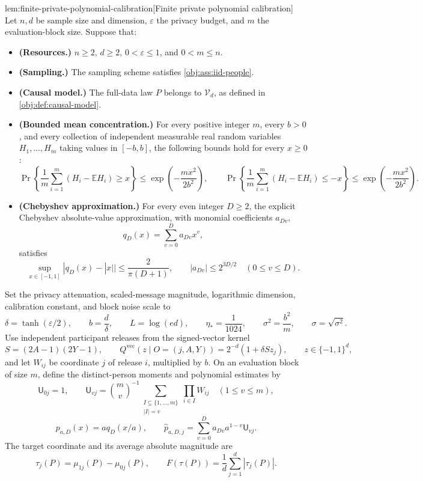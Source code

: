 \begin{lemmav}{lem:finite-private-polynomial-calibration}[Finite private polynomial calibration]
Let \(n,d\) be sample size and dimension, \(\varepsilon\) the privacy budget, and \(m\) the evaluation-block size. Suppose that:
\begin{itemize}
\item \textbf{(Resources.)} \(n\ge2\), \(d\ge2\), \(0<\varepsilon\le1\), and \(0<m\le n\).
\item \textbf{(Sampling.)} The sampling scheme satisfies \cref{obj:ass:iid-people}.
\item \textbf{(Causal model.)} The full-data law \(P\) belongs to \(\mathcal V_d\), as defined in \cref{obj:def:causal-model}.
\item \textbf{(Bounded mean concentration.)} For every positive integer \(m\), every \(b>0\), and every collection of independent measurable real random variables \(H_1,\ldots,H_m\) taking values in \([-b,b]\), the following bounds hold for every \(x\ge0\):
\[
 \Pr\!\left\{\frac1m\sum_{i=1}^m(H_i-\mathbb EH_i)\ge x\right\}
 \le \exp\!\left(-\frac{mx^2}{2b^2}\right),
 \qquad
 \Pr\!\left\{\frac1m\sum_{i=1}^m(H_i-\mathbb EH_i)\le -x\right\}
 \le \exp\!\left(-\frac{mx^2}{2b^2}\right).
\]
\item \textbf{(Chebyshev approximation.)} For every even integer \(D\ge2\), the explicit Chebyshev absolute-value approximation, with monomial coefficients \(a_{Dv}\),
\[
 q_D(x)=\sum_{v=0}^D a_{Dv}x^v,
\]
satisfies
\[
 \sup_{x\in[-1,1]}|q_D(x)-|x||\le\frac{2}{\pi(D+1)},
 \qquad
 |a_{Dv}|\le 2^{3D/2}\quad(0\le v\le D).
\]
\end{itemize}

Set the privacy attenuation, scaled-message magnitude, logarithmic dimension, calibration constant, and block noise scale to
\[
 \delta=\tanh(\varepsilon/2),\qquad
 b=\frac d\delta,\qquad
 L=\log(ed),\qquad
 \eta_*=\frac1{1024},\qquad
 \sigma^2=\frac{b^2}{m},\qquad
 \sigma=\sqrt{\sigma^2}.
\]
Use independent participant releases from the signed-vector kernel
\[
 S=(2A-1)(2Y-1),\qquad
 Q^{\mathrm{vec}}(z\mid O=(j,A,Y))
 =2^{-d}(1+\delta S z_j),
 \qquad z\in\{-1,1\}^d,
\]
and let \(W_{ij}\) be coordinate \(j\) of release \(i\), multiplied by \(b\). On an evaluation block of size \(m\), define the distinct-person moments and polynomial estimates by
\[
 \mathsf U_{0j}=1,\qquad
 \mathsf U_{vj}
 =\binom mv^{-1}
   \sum_{\substack{I\subseteq\{1,\ldots,m\}\\|I|=v}}
      \prod_{i\in I}W_{ij}
 \quad(1\le v\le m),
\]
\[
 p_{a,D}(x)=a q_D(x/a),\qquad
 \widehat p_{a,D,j}
 =\sum_{v=0}^D a_{Dv}a^{1-v}\mathsf U_{vj}.
\]
The target coordinate and its average absolute magnitude are
\[
 \tau_j(P)=\mu_{1j}(P)-\mu_{0j}(P),\qquad
 F(\tau(P))=\frac1d\sum_{j=1}^d|\tau_j(P)|.
\]


\end{lemmav}
